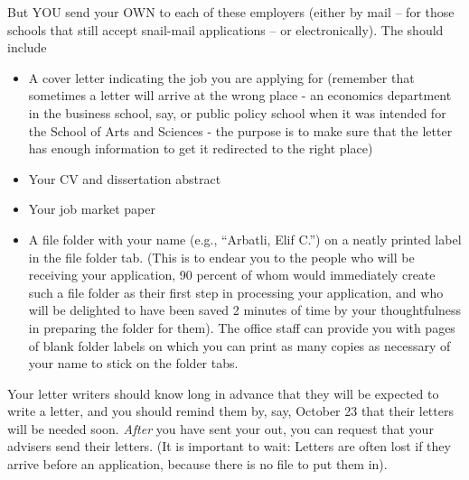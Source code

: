 \documentclass{econtex}
\begin{document}
\begin{enumerate}
But YOU send your OWN {\Acorn} to each of these employers (either by mail -- for those schools that still accept snail-mail applications -- or electronically).  The {\Acorn} should include
\begin{itemize}
\item A cover letter indicating the job you
  are applying for (remember that sometimes a letter will arrive at
  the wrong place - an economics department in the business school,
  say, or public policy school when it was intended for the School of
  Arts and Sciences - the purpose is to make sure that the letter has
  enough information to get it redirected to the right place)
\item Your CV and dissertation abstract
\item Your job market paper
\item A file folder with your name (e.g., ``Arbatli, Elif C.'') on a
  neatly printed label in the file folder tab.  (This is to endear you
  to the people who will be receiving your application, 90 percent of
  whom would immediately create such a file folder as their first step
  in processing your application, and who will be delighted to have
  been saved 2 minutes of time by your thoughtfulness in preparing the
  folder for them).  The office staff can provide you with pages of
  blank folder labels on which you can print as many copies as
  necessary of your name to stick on the folder tabs.
\end{itemize}

Your letter writers should know long in advance that they will be
expected to write a letter, and you should remind them by, say,
October 23 that their letters will be needed soon.  {\it After} you
have sent your \Acorn out, you can request that your advisers send
their letters.  (It is important to wait: Letters are often lost if
they arrive before an application, because there is no file to put
them in).  


\end{enumerate}
\end{document}
